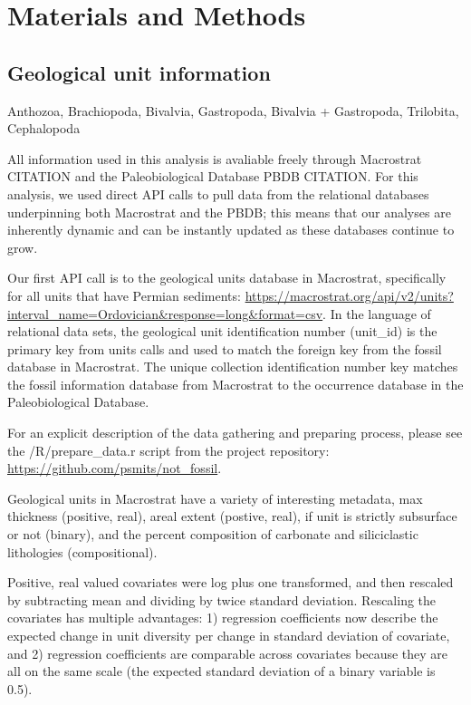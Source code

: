 \documentclass[12pt,letterpaper]{article}
\begin{document}
\section{Materials and Methods}

\subsection{Geological unit information}
Anthozoa, Brachiopoda, Bivalvia, Gastropoda, Bivalvia + Gastropoda, Trilobita, Cephalopoda

All information used in this analysis is avaliable freely through Macrostrat CITATION and the Paleobiological Database PBDB CITATION. For this analysis, we used direct API calls to pull data from the relational databases underpinning both Macrostrat and the PBDB; this means that our analyses are inherently dynamic and can be instantly updated as these databases continue to grow.

Our first API call is to the geological units database in Macrostrat, specifically for all units that have Permian sediments: \url{https://macrostrat.org/api/v2/units?interval\_name=Ordovician&response=long&format=csv}. In the language of relational data sets, the geological unit identification number (unit\_id) is the primary key from units calls and used to match the foreign key from the fossil database in Macrostrat. The unique collection identification number key matches the fossil information database from Macrostrat to the occurrence database in the Paleobiological Database.

For an explicit description of the data gathering and preparing process, please see the /R/prepare\_data.r script from the project repository: \url{https://github.com/psmits/not\_fossil}.

Geological units in Macrostrat have a variety of interesting metadata, max thickness (positive, real), areal extent (postive, real), if unit is strictly subsurface or not (binary), and the percent composition of carbonate and siliciclastic lithologies (compositional). 

Positive, real valued covariates were log plus one transformed, and then rescaled by subtracting mean and dividing by twice standard deviation. Rescaling the covariates has multiple advantages: 1) regression coefficients now describe the expected change in unit diversity per change in standard deviation of covariate, and 2) regression coefficients are comparable across covariates because they are all on the same scale (the expected standard deviation of a binary variable is 0.5).
\end{document}
